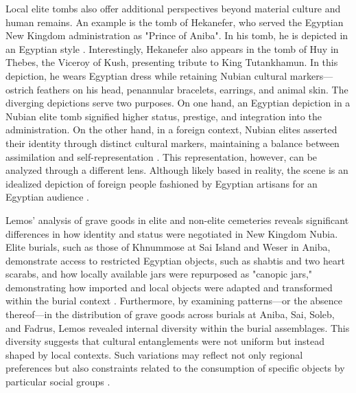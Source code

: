 Local elite tombs also offer additional perspectives beyond material culture and human remains. An example is the tomb of Hekanefer, who served the Egyptian New Kingdom administration as "Prince of Aniba". In his tomb, he is depicted in an Egyptian style \parencite{simpsonHekaneferDynasticMaterial1963}. Interestingly, Hekanefer also appears in the tomb of Huy in Thebes, the Viceroy of Kush, presenting tribute to King Tutankhamun. In this depiction, he wears Egyptian dress while retaining Nubian cultural markers---ostrich feathers on his head, penannular bracelets, earrings, and animal skin. The diverging depictions serve two purposes. On one hand, an Egyptian depiction in a Nubian elite tomb signified higher status, prestige, and integration into the administration. On the other hand, in a foreign context, Nubian elites asserted their identity through distinct cultural markers, maintaining a balance between assimilation and self-representation \parencites{törökTwoWorldsFrontier2009}{vanpeltRevisingEgyptoNubianRelations2013}{smithHekaneferLowerNubian2015}. This representation, however, can be analyzed through a different lens. Although likely based in reality, the scene is an idealized depiction of foreign people fashioned by Egyptian artisans for an Egyptian audience
\parencites{burmeisterSicherungEthnischenOrdnung2013}{matićDritteRaumHybridität2017}.


Lemos' analysis of grave goods in elite and non-elite cemeteries reveals significant differences in how identity and status were negotiated in New Kingdom Nubia. Elite burials, such as those of Khnummose at Sai Island and Weser in Aniba, demonstrate access to restricted Egyptian objects, such as shabtis and two heart scarabs, and how locally available jars were repurposed as "canopic jars," demonstrating how imported and local objects were adapted and transformed within the burial context \parencites[p.~7]{lemosAlternativesColonizationMarginal2021}[p.~76-77]{lemosCulturalEntanglementsExperiencing2024}. Furthermore, by examining patterns---or the absence thereof---in the distribution of grave goods across burials at Aniba, Sai, Soleb, and Fadrus, Lemos revealed  internal diversity within the burial assemblages. This diversity suggests that cultural entanglements were not uniform but instead shaped by local contexts. Such variations may reflect not only regional preferences but also constraints related to the consumption of specific objects by particular social groups \parencite{lemosForeignObjectsLocal2020}.


